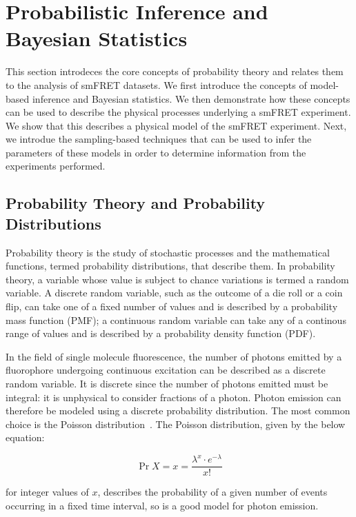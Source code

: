 \section{Probabilistic Inference and Bayesian Statistics}
This section introdeces the core concepts of probability theory and relates them to the analysis of smFRET datasets. We first introduce the concepts of model-based inference and Bayesian statistics. We then demonstrate how these concepts can be used to describe the physical processes underlying a smFRET experiment. We show that this describes a physical model of the smFRET experiment. Next, we introdue the sampling-based techniques that can be used to infer the parameters of these models in order to determine information from the experiments performed.   

\subsection{Probability Theory and Probability Distributions}
Probability theory is the study of stochastic processes and the mathematical functions, termed probability distributions, that describe them. In probability theory, a variable whose value is subject to chance variations is termed a random variable. A discrete random variable, such as the outcome of a die roll or a coin flip, can take one of a fixed number of values and is described by a probability mass function (PMF); a continuous random variable can take any of a continous range of values and is described by a probability density function (PDF). 

In the field of single molecule fluorescence, the number of photons emitted by a fluorophore undergoing continuous excitation can be described as a discrete random variable. It is discrete since the number of photons emitted must be integral: it is unphysical to consider fractions of a photon. Photon emission can therefore be modeled using a discrete probability distribution. The most common choice is the Poisson distribution~\cite{???}. The Poisson distribution, given by the below equation:

\begin{equation}
\Pr{X = x} = \frac{\lambda^x \cdot e^{-\lambda}}{x!}
\label{eq:poisson}
\end{equation}
 
for integer values of $x$, describes the probability of a given number of events occurring in a fixed time interval, so is a good model for photon emission. 


